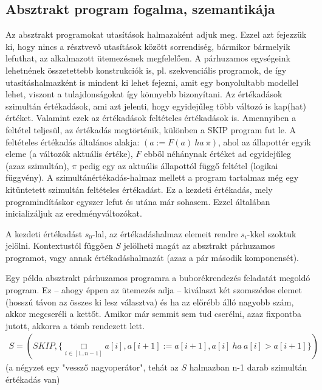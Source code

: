 \documentclass{article}
\begin{document}
\subsection*{Absztrakt program fogalma, szemantikája}
Az absztrakt programokat utasítások halmazaként adjuk meg. Ezzel azt fejezzük ki, hogy nincs a résztvevő utasítások között sorrendiség, bármikor bármelyik lefuthat, az alkalmazott ütemezésnek megfelelően. A párhuzamos egységeink lehetnének összetettebb konstrukciók is, pl. szekvenciális programok, de így utasításhalmazként is mindent ki lehet fejezni, amit egy bonyolultabb modellel lehet, viszont a tulajdonságokat így könnyebb bizonyítani. Az értékadások szimultán értékadások, ami azt jelenti, hogy egyidejűleg több változó is kap(hat) értéket. Valamint ezek az értékadások feltételes értékadások is. Amennyiben a feltétel teljesül, az értékadás megtörténik, különben a SKIP program fut le. A feltételes értékadás általános alakja: $(a := F(a)\ ha\ \pi)$, ahol az állapottér egyik eleme (a változók aktuális értéke), $F$ ebből néhánynak értéket ad egyidejűleg (azaz szimultán), $\pi$ pedig egy az aktuális állapottól függő feltétel (logikai függvény). A szimultánértékadás-halmaz mellett a program tartalmaz még egy kitüntetett szimultán feltételes értékadást. Ez a kezdeti értékadás, mely programindításkor egyszer lefut és utána már sohasem. Ezzel általában inicializáljuk az eredményváltozókat. 

A kezdeti értékadást $s_0$-lal, az értékadáshalmaz elemeit rendre $s_i$-kkel szoktuk jelölni. Kontextustól függően $S$ jelölheti magát az absztrakt párhuzamos programot, vagy annak értékadáshalmazát (azaz a pár második komponensét).

Egy példa absztrakt párhuzamos programra a buborékrendezés feladatát megoldó program. Ez – ahogy éppen az ütemezés adja – kiválaszt két szomszédos elemet (hosszú távon az összes ki lesz választva) és ha az előrébb álló nagyobb szám, akkor megcseréli a kettőt. Amikor már semmit sem tud cserélni, azaz fixpontba jutott, akkorra a tömb rendezett lett.
\begin{align*}
S = (SKIP, \lbrace \underset{i\in[1..n-1]}{\Box} a[i],a[i+1] := a[i+1],a[i]\ ha\ a[i] > a[i+1] \rbrace)
\end{align*}
(a négyzet egy "vessző nagyoperátor", tehát az $S$ halmazban n-1 darab szimultán értékadás van)
\end{document}
